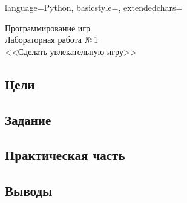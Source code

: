 \documentclass[12pt]{article}
\newcommand{\StudentName}{Ильвохин Дмитрий}
\newcommand{\Group}{1O-106М}
\newcommand{\CourseName}{Программирование игр}
\newcommand{\LabNum}{1}
\newcommand{\Subject}{Сделать увлекательную игру}
\begin{document}

\lstset
{
        language=Python,
        basicstyle=\footnotesize,%
        extendedchars=\true
}

\begin{flushright}
\Large{
	\CourseName \\
	Лабораторная работа №\,\LabNum \\
	<<\Subject>> \\
}
\end{flushright}

\subsection*{Цели}

\subsection*{Задание}

\subsection*{Практическая часть}

\subsection*{Выводы}
\end{document}
